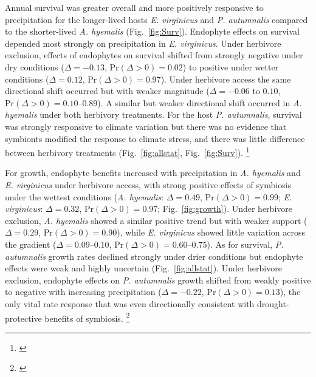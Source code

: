 \documentclass[12pt]{article}\usepackage[]{graphicx}\usepackage[dvipsnames]{xcolor}
\newcommand{\tom}[2]{{\color{red}{#1}}\footnote{\textit{\color{red}{#2}}}}
\begin{document}
Annual survival was greater overall and more positively responsive to precipitation for the longer-lived hosts \textit{E. virginicus} and \textit{P. autumnalis} compared to the shorter-lived \textit{A. hyemalis} (Fig.~\ref{fig:Surv}).
Endophyte effects on survival depended most strongly on precipitation in \textit{E. virginicus}. 
Under herbivore exclusion, effects of endophytes on survival shifted from strongly negative under dry conditions ($\Delta = -0.13$, $\mathrm{Pr}(\Delta > 0) = 0.02$) to positive under wetter conditions ($\Delta = 0.12$, $\mathrm{Pr}(\Delta > 0) = 0.97$). 
Under herbivore access the same directional shift occurred but with weaker magnitude ($\Delta = -0.06$ to $0.10$, $\mathrm{Pr}(\Delta > 0) = 0.10$--$0.89$). 
A similar but weaker directional shift occurred in \textit{A. hyemalis} under both herbivory treatments.
For the host \textit{P. autumnalis}, survival was strongly responsive to climate variation but there was no evidence that symbionts modified the response to climate stress, and there was little difference between herbivory treatments (Fig.~\ref{fig:allstat}, Fig.~\ref{fig:Surv}).
\tom{}{For all the figures that use point size to represent sample size, you need a legend to communicate how point sizes translate to sample sizes. At the very least, the caption should indicate the range.}

For growth, endophyte benefits increased with precipitation in \textit{A. hyemalis} and \textit{E. virginicus} under herbivore access, with strong positive effects of symbiosis under the wettest conditions (\textit{A. hyemalis}: $\Delta = 0.49$, $\mathrm{Pr}(\Delta > 0) = 0.99$; \textit{E. virginicus}: $\Delta = 0.32$, $\mathrm{Pr}(\Delta > 0) = 0.97$; Fig.~\ref{fig:growth}). 
Under herbivore exclusion, \textit{A. hyemalis} showed a similar positive trend but with weaker support ($\Delta = 0.29$, $\mathrm{Pr}(\Delta > 0) = 0.90$), while \textit{E. virginicus} showed little variation across the gradient ($\Delta = 0.09$--$0.10$, $\mathrm{Pr}(\Delta > 0) = 0.60$--$0.75$). 
As for survival, \textit{P. autumnalis} growth rates declined strongly under drier conditions but endophyte effects were weak and highly uncertain (Fig.~\ref{fig:allstat}). 
Under herbivore exclusion, endophyte effects on \textit{P. autumnalis} growth shifted from weakly positive to negative with increasing precipitation ($\Delta = -0.22$, $\mathrm{Pr}(\Delta > 0) = 0.13$), the only vital rate response that was even directionally consistent with drought-protective benefits of symbiosis.
\tom{}{Unclear why the panels of the growth figure are different sizes for each species.}
\end{document}
